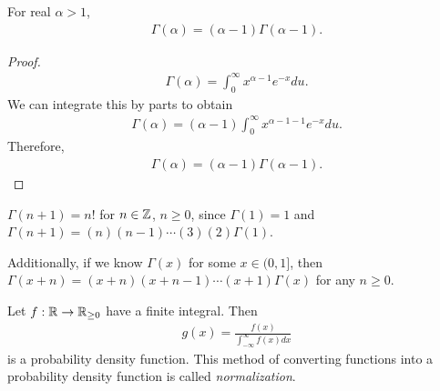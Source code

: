 \begin{prop}
    For real $\alpha > 1$,
    \begin{align*}
        \Gamma(\alpha) = (\alpha - 1)\Gamma(\alpha - 1).
    \end{align*}
\end{prop}

\begin{proof}
    \begin{align*}
        \Gamma(\alpha) = \int_{0}^{\infty}x^{\alpha - 1}e^{-x}du.
    \end{align*}
    We can integrate this by parts to obtain
    \begin{align*}
        \Gamma(\alpha) = (\alpha - 1)\int_{0}^{\infty}x^{\alpha - 1 - 1}e^{-x}du.
    \end{align*}
    Therefore,
    \begin{align*}
        \Gamma(\alpha) = (\alpha - 1)\Gamma(\alpha - 1).
    \end{align*}
\end{proof}

\begin{rmk}
    $\Gamma(n+1) = n!$ for $n \in \mathbb{Z}$, $n \geq 0$, since $\Gamma(1) = 1$ and $\Gamma(n+1) = (n)(n-1)\cdots(3)(2)\Gamma(1)$.

    Additionally, if we know $\Gamma(x)$ for some $x \in (0, 1]$, then $\Gamma(x + n) = (x + n)(x + n - 1)\cdots(x + 1)\Gamma(x)$ for any $n \geq 0$.
\end{rmk}

\begin{prop}
    Let $f: \mathbb{R} \to \mathbb{R}_{\geq 0}$ have a finite integral. Then
    \begin{align*}
        g(x) = \frac{f(x)}{\int_{-\infty}^{\infty}f(x)dx}
    \end{align*}
    is a probability density function. This method of converting functions into a probability density function is called \emph{normalization}.
\end{prop}

